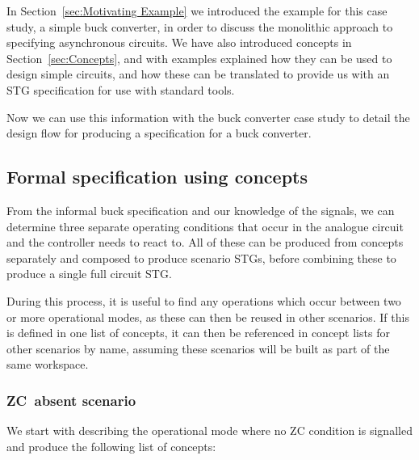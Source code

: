 \documentclass[british,compsoc]{IEEEtran}
\begin{document}
In Section~\ref{sec:Motivating Example} we introduced the example for this case study, a simple buck converter,
in order to discuss the monolithic approach to specifying asynchronous circuits. We have also introduced concepts in Section~\ref{sec:Concepts},
and with examples explained how they can be used to design simple circuits, and how these can be translated to
provide us with an STG specification for use with standard tools.

Now we can use this information with the buck converter case study to detail the design flow for producing a
specification for a buck converter.

\subsection{Formal specification using concepts}

From the informal buck specification and our knowledge of the signals,
we can determine three separate operating conditions that occur in
the analogue circuit and the controller needs to react to. All of
these can be produced from concepts separately and composed to produce
scenario STGs, before combining these to produce a single full circuit
STG.

During this process, it is useful to find any operations which occur
between two or more operational modes, as these can then be reused
in other scenarios. If this is defined in one list of concepts, it
can then be referenced in concept lists for other scenarios by name, assuming these scenarios will be built as part of the same workspace.

\subsubsection{ZC~absent scenario}

We start with describing the operational mode where no ZC condition
is signalled and produce the following list of concepts:
\end{document}
